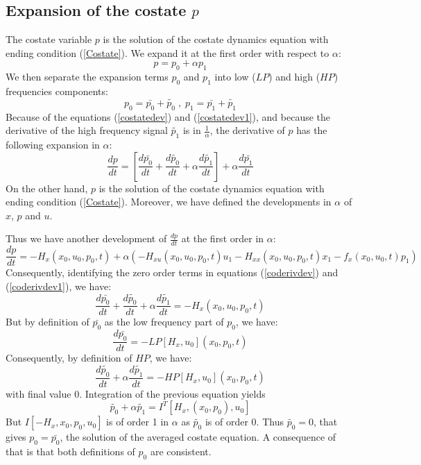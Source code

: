 \documentclass[a4paper,10pt]{article}
\begin{document}
\subsection{Expansion of the costate $p$}\label{costateExpProof}
The costate variable $p$ is the solution of the costate dynamics 
equation with ending condition (\ref{Costate}). We expand it at the 
first order with respect to $\alpha$:
\begin{equation}
        p = p_{0} + \alpha p_{1} 
    \label{costatedev}
\end{equation}
We then separate the expansion terms $p_{0}$ and $p_{1}$ into low ($LP$) and high 
($HP$) frequencies components:
\begin{equation}
        p_{0} = \bar{p_{0}} +\tilde{p_{0}} \; , \;
        p_{1} = \bar{p_{1}} +\tilde{p_{1}}
    \label{costatedev1}
\end{equation}
Because of the equations (\ref{costatedev}) and (\ref{costatedev1}), and 
because  the derivative of the high frequency signal $\tilde{p_{1}}$ 
is in $\frac{1}{\alpha}$, the derivative of $p$ has the following 
expansion in $\alpha$:
\begin{equation}
    \frac{dp}{dt} = \left[ \frac{d \bar{p_{0}}}{dt}
    + \frac{d \tilde{p_{0}}}{dt} 
    + \alpha \frac{d \tilde{p_{1}}}{dt} \right]
   + \alpha \frac{d \bar{p_{1}}}{dt}
    \label{coderivdev}
\end{equation}
On the other hand,  $p$ is the solution of the costate dynamics 
equation with ending condition (\ref{Costate}). Moreover, we have 
defined the developments in $\alpha$ of $x$, $p$ and $u$. 

Thus we have another development of $\frac{dp}{dt}$ at the first order in $\alpha$:
\begin{equation}
    \frac{dp}{dt} = -H_{x}(x_{0},u_{0},p_{0},t) 
    + \alpha (-H_{xu}(x_{0},u_{0},p_{0},t)u_{1} 
    -H_{xx}(x_{0},u_{0},p_{0},t)x_{1} -f_{x}(x_{0},u_{0},t)p_{1})
    \label{coderivdev1}
\end{equation}
Consequently, identifying the zero order terms in  equations 
(\ref{coderivdev}) and (\ref{coderivdev1}), we have:
\[
      \frac{d \bar{p_{0}}}{dt}
        + \frac{d \tilde{p_{0}}}{dt} 
        + \alpha \frac{d \tilde{p_{1}}}{dt} = -H_{x}(x_{0},u_{0},p_{0},t) 
\]
But by definition of $\bar{p_{0}}$ as the low frequency part of 
$p_{0}$, we have:
\[
   \frac{d \bar{p_{0}}}{dt} = -LP[H_{x},u_{0}](x_{0},p_{0},t)  
\]
Consequently, by definition of $HP$, we have:
\[
  \frac{d \tilde{p_{0}}}{dt} 
    + \alpha \frac{d \tilde{p_{1}}}{dt} = -HP[H_{x},u_{0}](x_{0},p_{0},t)  
\]
with final value $0$. Integration of the previous equation yields
\[
    \tilde{p_{0}} + \alpha \tilde{p_{1}} = I^{T}[H_{x},(x_{0},p_{0}),u_{0}]
\]
But $I[-H_{x},x_{0},p_{0},u_{0}]$ is of order 1 in $\alpha$ as 
$\tilde{p_{0}}$ is of order 0. Thus $\tilde{p_{0}}=0$, that gives 
$p_{0}=\bar{p_{0}}$, the solution of the averaged costate equation.
A consequence of that is that both definitions of $p_{0}$ are consistent.
\end{document}
